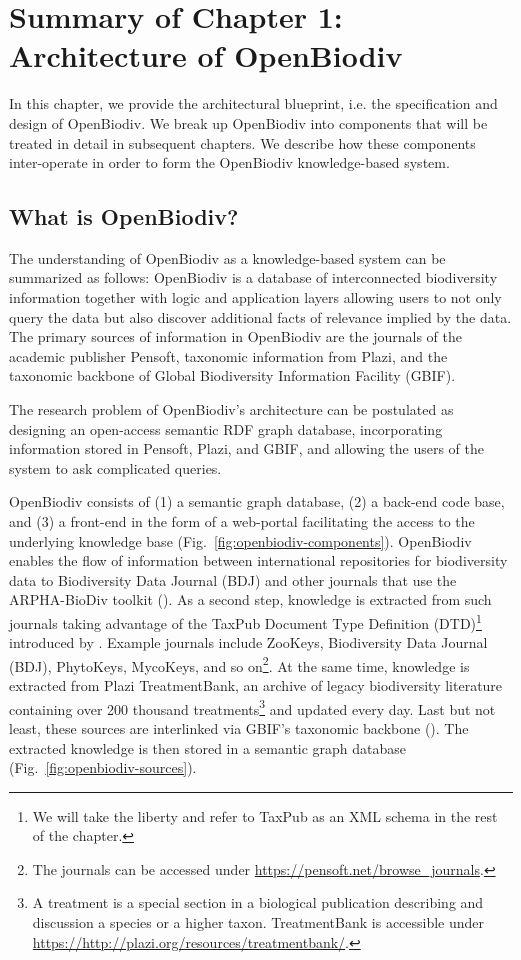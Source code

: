 \chapter{Summary of Chapter 1: Architecture of OpenBiodiv}
\label{chapter-openbiodiv}

In this chapter, we provide the architectural blueprint, i.e. the specification and design of OpenBiodiv. We break up OpenBiodiv into components that will be treated in detail in subsequent chapters. We describe how these components inter-operate in order to form the OpenBiodiv knowledge-based system.

\section{What is OpenBiodiv?}

The understanding of OpenBiodiv as a knowledge-based system can be summarized as follows: OpenBiodiv is a  database of interconnected biodiversity information together with logic and application layers allowing users to not only query the data but also discover additional facts of relevance implied by the data. The primary sources of information in OpenBiodiv are the journals of the academic publisher Pensoft, taxonomic information from Plazi, and the taxonomic backbone of Global Biodiversity Information Facility (GBIF).

The research problem of OpenBiodiv's architecture can be postulated as designing an open-access semantic RDF graph database, incorporating information stored in Pensoft, Plazi, and GBIF, and allowing the users of the system to ask complicated queries. 

OpenBiodiv consists of (1) a semantic graph database, (2) a back-end code base, and (3) a front-end in the form of a web-portal facilitating the access to the underlying knowledge base (Fig.~\ref{fig:openbiodiv-components}). OpenBiodiv enables the flow of information between international repositories for biodiversity data to Biodiversity Data Journal (BDJ) and other journals that use the ARPHA-BioDiv toolkit (\cite{penev_arpha-biodiv:_2017}). As a second step, knowledge is extracted from such journals taking advantage of the TaxPub Document Type Definition (DTD)\footnote{We will take the liberty and refer to TaxPub as an XML schema in the rest of the chapter.} introduced by \cite{catapano_taxpub:_2010}. Example journals include ZooKeys, Biodiversity Data Journal (BDJ), PhytoKeys, MycoKeys, and so on\footnote{The journals can be accessed under \url{https://pensoft.net/browse_journals}.}. At the same time, knowledge is extracted from Plazi TreatmentBank, an archive of legacy biodiversity literature containing over 200 thousand treatments\footnote{A treatment is a special section in a biological publication describing and discussion a species or a higher taxon. TreatmentBank is accessible under \url{https://http://plazi.org/resources/treatmentbank/}.} and updated every day. Last but not least, these sources are interlinked via GBIF's taxonomic backbone (\cite{gbif_secretariat_gbif_2017}). The extracted knowledge is then stored in a semantic graph database (Fig.~\ref{fig:openbiodiv-sources}).

